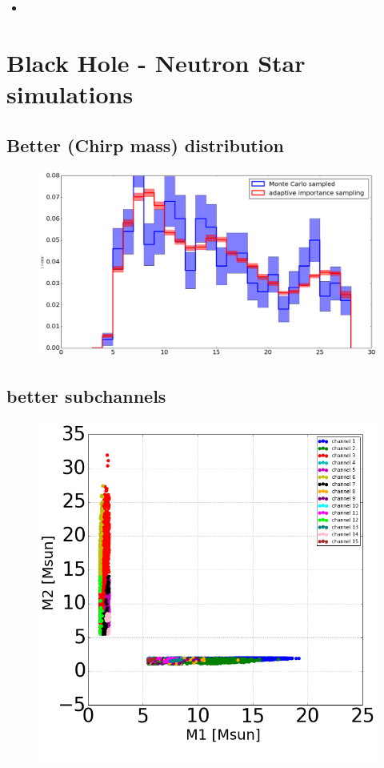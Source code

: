 \documentclass[a4paper,fleqn,usenatbib]{mnras}
\begin{document}
%
\begin{itemize}
\item 
\end{itemize}
%


\section{Black Hole - Neutron Star simulations}
\label{sec:BHNSresults}
\subsection{Better (Chirp mass) distribution}
\label{subsec:ChirpDistributionI}
%
\begin{figure}[h]
	{\includegraphics[width=1\linewidth]{images/histogram_2}}
\caption{}\label{fig:ToyModel-snakeplot}
\end{figure}

\subsection{better subchannels}
\begin{figure}[h]
	{\includegraphics[width=1\linewidth]{images/Channalsv0}}
\caption{}\label{fig:BHNS-subchannels}
\end{figure}
\end{document}
